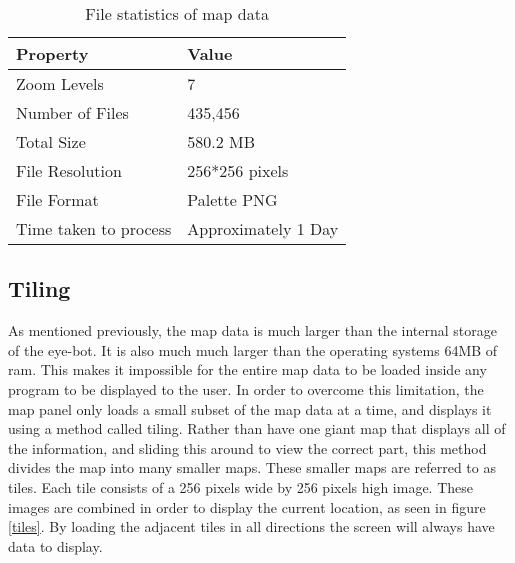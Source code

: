 
\begin{table}[htdp]
\begin{center}
    \begin{tabular}{|l|l|}
        \hline
        Property              & Value                             \\ \hline
        Zoom Levels           & 7                                 \\ 
        Number of Files       & 435,456 \\ 
        Total Size            & 580.2 MB                          \\
        File Resolution            & 256*256 pixels                          \\  
        File Format            & Palette PNG                         \\ 
        Time taken to process & Approximately 1 Day                          \\
        \hline
    \end{tabular}
	\caption[File statistics of map data]{File statistics of map data}
	\label{tab:mapdata}
\end{center}
\end{table}

\subsection{Tiling}

As mentioned previously, the map data is much larger than the internal storage of the eye-bot. It is also much much larger than the operating systems 64MB of ram. This makes it impossible for the entire map data to be loaded inside any program to be displayed to the user. In order to overcome this limitation, the map panel only loads a small subset of the map data at a time, and displays it using a method called tiling. Rather than have one giant map that displays all of the information, and sliding this around to view the correct part, this method divides the map into many smaller maps. These smaller maps are referred to as tiles. Each tile consists of a 256 pixels wide by 256 pixels high image. These images are combined in order to display the current location, as seen in figure \ref{tiles}. By loading the adjacent tiles in all directions the screen will always have data to display.

